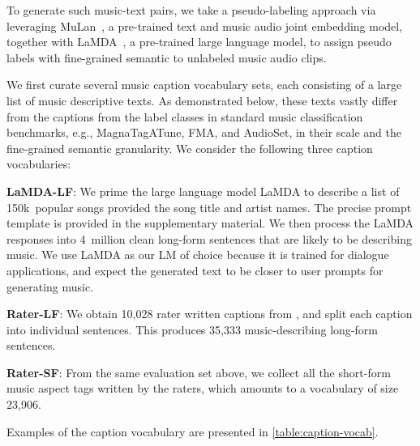 To generate such music-text pairs, we take a pseudo-labeling approach via leveraging MuLan~\cite{mulan2022}, a pre-trained text and music audio joint embedding model, together with LaMDA~\cite{thoppilan2022lamda}, a pre-trained large language model, to assign pseudo labels with fine-grained semantic to unlabeled music audio clips.

We first curate several music caption vocabulary sets, each consisting of a large list of music descriptive texts. As demonstrated below, these texts vastly differ from the captions from the label classes in standard music classification benchmarks, e.g., MagnaTagATune, FMA, and AudioSet, in their scale and the fine-grained semantic granularity. We consider the following three caption vocabularies:

\textbf{LaMDA-LF}: We prime the large language model LaMDA to describe a list of 150k~popular songs provided the song title and artist names. The precise prompt template is provided in the supplementary material. We then process the LaMDA responses into 4~million clean long-form sentences that are likely to be describing music.
We use LaMDA as our LM of choice because it is trained for dialogue applications, and expect the generated text to be closer to user prompts for generating music. 

\textbf{Rater-LF}: We obtain 10,028 rater written captions from \EvalSet, and split each caption into individual sentences. This produces 35,333 music-describing long-form sentences.

\textbf{Rater-SF}: From the same evaluation set above, we collect all the short-form music aspect tags written by the raters, which amounts to a vocabulary of size 23,906.

Examples of the caption vocabulary are presented in \cref{table:caption-vocab}.

